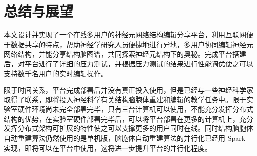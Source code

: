 \chapter{总结与展望}
本文设计并实现了一个在线多用户的神经元网络结构编辑分享平台，利用互联网便于数据共享的特点，帮助神经学研究人员便捷地进行异地，多用户协同编辑神经元网络结构，并能分享结构脑图谱，共同探索神经元结构下的奥秘。完成平台搭建后，对平台进行了详细的压力测试，并根据压力测试的结果进行性能调优使之可以支持数千名用户的实时编辑操作。

限于时间关系，平台完成部署后并没有真正投入使用，但是已经与一些神经科学家取得了联系，即将投入神经科学有关结构脑胞体重建和编辑的教学任务中。限于实验室硬件环境尚未完全部署完毕，只有三台计算机可以使用，不能充分发挥分布式结构的优势，在实验室硬件部署完毕后，可以将平台部署在更多的计算机上，充分发挥分布式架构可扩展的特性使之可以支撑更多的用户同时在线。同时结构脑胞体自动重建算法仍然使用的是单机版，脑胞体自动重建算法的并行化已经用 Spark 实现，即将可以在平台中使用，这将进一步提升平台的并行化程度。




